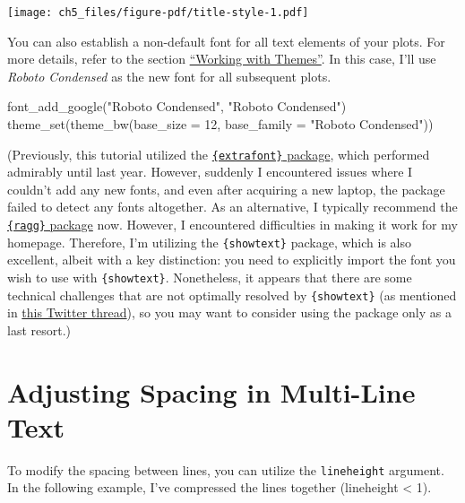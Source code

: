 \documentclass[
  letterpaper,
  DIV=11,
  numbers=noendperiod]{scrreprt}
\newenvironment{Shaded}{\begin{snugshade}}{\end{snugshade}}
\newcommand{\AttributeTok}[1]{\textcolor[rgb]{0.40,0.45,0.13}{#1}}
\newcommand{\DecValTok}[1]{\textcolor[rgb]{0.68,0.00,0.00}{#1}}
\newcommand{\FunctionTok}[1]{\textcolor[rgb]{0.28,0.35,0.67}{#1}}
\newcommand{\NormalTok}[1]{\textcolor[rgb]{0.00,0.23,0.31}{#1}}
\newcommand{\StringTok}[1]{\textcolor[rgb]{0.13,0.47,0.30}{#1}}
\begin{document}
\texttt{[image: ch5\_files/figure-pdf/title-style-1.pdf]}

You can also establish a non-default font for all text elements of your
plots. For more details, refer to the section
\hyperref[themes]{``Working with Themes''}. In this case, I'll use
\emph{Roboto Condensed} as the new font for all subsequent plots.

\begin{Shaded}
\begin{Highlighting}[]
\FunctionTok{font\_add\_google}\NormalTok{(}\StringTok{"Roboto Condensed"}\NormalTok{, }\StringTok{"Roboto Condensed"}\NormalTok{)}
\FunctionTok{theme\_set}\NormalTok{(}\FunctionTok{theme\_bw}\NormalTok{(}\AttributeTok{base\_size =} \DecValTok{12}\NormalTok{, }\AttributeTok{base\_family =} \StringTok{"Roboto Condensed"}\NormalTok{))}
\end{Highlighting}
\end{Shaded}

(Previously, this tutorial utilized the
\href{https://cran.r-project.org/web/packages/extrafont/README.html}{\texttt{\{extrafont\}}
package}, which performed admirably until last year. However, suddenly I
encountered issues where I couldn't add any new fonts, and even after
acquiring a new laptop, the package failed to detect any fonts
altogether. As an alternative, I typically recommend the
\href{https://ragg.r-lib.org/}{\texttt{\{ragg\}} package} now. However,
I encountered difficulties in making it work for my homepage. Therefore,
I'm utilizing the \texttt{\{showtext\}} package, which is also
excellent, albeit with a key distinction: you need to explicitly import
the font you wish to use with \texttt{\{showtext\}}. Nonetheless, it
appears that there are some technical challenges that are not optimally
resolved by \texttt{\{showtext\}} (as mentioned in
\href{https://twitter.com/thomasp85/status/1355083725156077571}{this
Twitter thread}), so you may want to consider using the package only as
a last resort.)

\section{Adjusting Spacing in Multi-Line
Text}\label{adjusting-spacing-in-multi-line-text}

To modify the spacing between lines, you can utilize the
\texttt{lineheight} argument. In the following example, I've compressed
the lines together (lineheight \textless{} 1).
\end{document}
